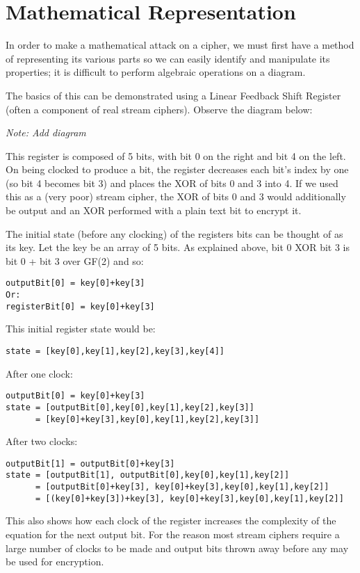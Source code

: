 \documentclass{report}
\begin{document}
\section{Mathematical Representation}
In order to make a mathematical attack on a cipher, we must first have a method
of representing its various parts so we can easily identify and manipulate its properties; it is difficult to perform algebraic operations on a diagram.

The basics of this can be demonstrated using a Linear Feedback Shift Register (often a component of real stream ciphers). Observe the diagram below:

\textit{Note: Add diagram}

This register is composed of 5 bits, with bit 0 on the right and bit 4 on the left. On being clocked to produce a bit, the register decreases each bit's index by one (so bit 4 becomes bit 3) and places the XOR of bits 0 and 3 into 4. If we used this as a (very poor) stream cipher, the XOR of bits 0 and 3 would additionally be output and an XOR performed with a plain text bit to encrypt it.

The initial state (before any clocking) of the registers bits can be thought of as its key. Let the key be an array of 5 bits. As explained above, bit 0 XOR bit 3 is bit 0 + bit 3 over GF(2) and so:
\begin{verbatim}
outputBit[0] = key[0]+key[3]
Or:
registerBit[0] = key[0]+key[3]
\end{verbatim}
This initial register state would be:
\begin{verbatim}
state = [key[0],key[1],key[2],key[3],key[4]]
\end{verbatim}
After one clock:
\begin{verbatim}
outputBit[0] = key[0]+key[3]
state = [outputBit[0],key[0],key[1],key[2],key[3]]
      = [key[0]+key[3],key[0],key[1],key[2],key[3]]
\end{verbatim}
After two clocks:
\begin{verbatim}
outputBit[1] = outputBit[0]+key[3]
state = [outputBit[1], outputBit[0],key[0],key[1],key[2]]
      = [outputBit[0]+key[3], key[0]+key[3],key[0],key[1],key[2]]
      = [(key[0]+key[3])+key[3], key[0]+key[3],key[0],key[1],key[2]]
\end{verbatim}
This also shows how each clock of the register increases the complexity of the equation for the next output bit. For the reason most stream ciphers require a large number of clocks to be made and output bits thrown away before any may be used for encryption.
\end{document}
